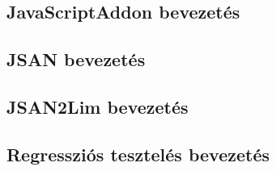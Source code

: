 \subsection{JavaScriptAddon bevezetés}

\subsection{JSAN bevezetés}

\subsection{JSAN2Lim bevezetés}

\subsection{Regressziós tesztelés bevezetés}
